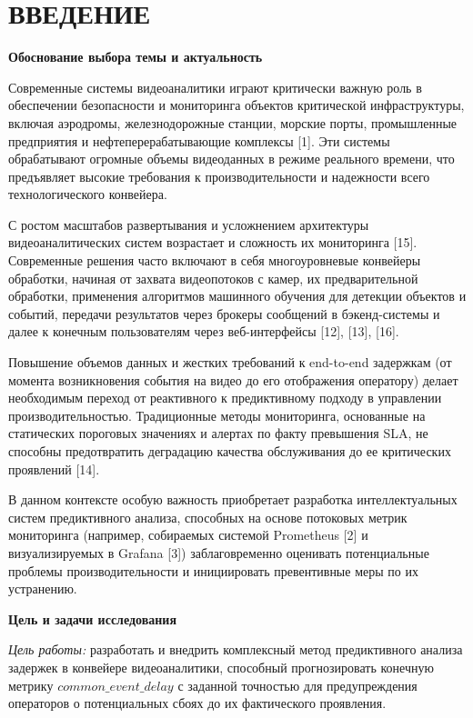 \newpage
\chapter*{ВВЕДЕНИЕ}  


\textbf{Обоснование выбора темы и актуальность}

Современные системы видеоаналитики играют критически важную роль в обеспечении безопасности и мониторинга объектов критической инфраструктуры, включая аэродромы, железнодорожные станции, морские порты, промышленные предприятия и нефтеперерабатывающие комплексы [1]. Эти системы обрабатывают огромные объемы видеоданных в режиме реального времени, что предъявляет высокие требования к производительности и надежности всего технологического конвейера.

С ростом масштабов развертывания и усложнением архитектуры видеоаналитических систем возрастает и сложность их мониторинга [15]. Современные решения часто включают в себя многоуровневые конвейеры обработки, начиная от захвата видеопотоков с камер, их предварительной обработки, применения алгоритмов машинного обучения для детекции объектов и событий, передачи результатов через брокеры сообщений в бэкенд-системы и далее к конечным пользователям через веб-интерфейсы [12], [13], [16].

Повышение объемов данных и жестких требований к end-to-end задержкам (от момента возникновения события на видео до его отображения оператору) делает необходимым переход от реактивного к предиктивному подходу в управлении производительностью. Традиционные методы мониторинга, основанные на статических пороговых значениях и алертах по факту превышения SLA, не способны предотвратить деградацию качества обслуживания до ее критических проявлений [14].

В данном контексте особую важность приобретает разработка интеллектуальных систем предиктивного анализа, способных на основе потоковых метрик мониторинга (например, собираемых системой Prometheus [2] и визуализируемых в Grafana [3]) заблаговременно оценивать потенциальные проблемы производительности и инициировать превентивные меры по их устранению.

\textbf{Цель и задачи исследования}

\textit{Цель работы:} разработать и внедрить комплексный метод предиктивного анализа задержек в конвейере видеоаналитики, способный прогнозировать конечную метрику $common\_event\_delay$ с заданной точностью для предупреждения операторов о потенциальных сбоях до их фактического проявления.

